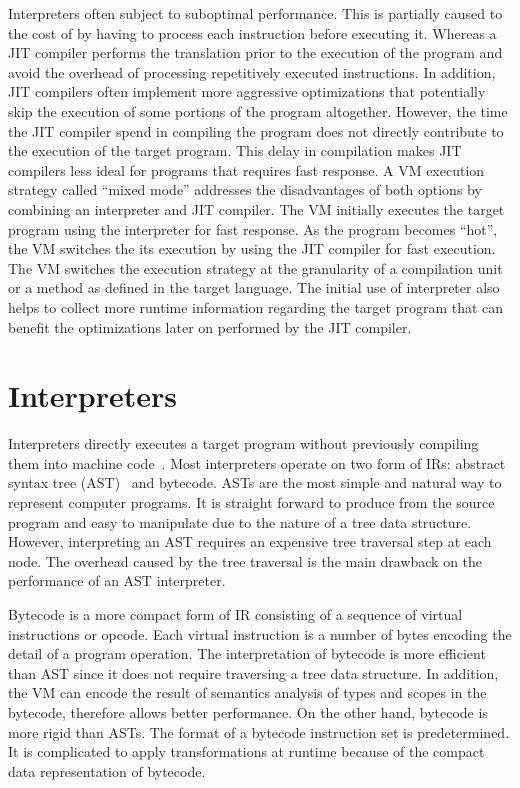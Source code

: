 Interpreters often subject to suboptimal performance.
This is partially caused to the cost of by having to process each instruction before executing it.
Whereas a JIT compiler performs the translation prior to the execution of the program and avoid the overhead of processing repetitively executed instructions.
In addition, JIT compilers often implement more aggressive optimizations that potentially skip the execution of some portions of the program altogether.
However, the time the JIT compiler spend in compiling the program does not directly contribute to the execution of the target program.
This delay in compilation makes JIT compilers less ideal for programs that requires fast response.
A VM execution strategy called ``mixed mode'' addresses the disadvantages of both options by combining an interpreter and JIT compiler.
The VM initially executes the target program using the interpreter for fast response.
As the program becomes ``hot'', the VM switches the its execution by using the JIT compiler for fast execution.
The VM switches the execution strategy at the granularity of a compilation unit or a method as defined in the target language.
The initial use of interpreter also helps to collect more runtime information regarding the target program that can benefit the optimizations later on performed by the JIT compiler.

\section{Interpreters}

Interpreters directly executes a target program without previously compiling them into machine code~\cite{debaere.campenhout+90, kogge+82}.
Most interpreters operate on two form of IRs: abstract syntax tree (AST)~\cite{jones2003abstract} and bytecode.
ASTs are the most simple and natural way to represent computer programs.
It is straight forward to produce from the source program and easy to manipulate due to the nature of a tree data structure.
However, interpreting an AST requires an expensive tree traversal step at each node.
The overhead caused by the tree traversal is the main drawback on the performance of an AST interpreter.

Bytecode is a more compact form of IR consisting of a sequence of virtual instructions or opcode.
Each virtual instruction is a number of bytes encoding the detail of a program operation.
The interpretation of bytecode is more efficient than AST since it does not require traversing a tree data structure.
In addition, the VM can encode the result of semantics analysis of types and scopes in the bytecode, therefore allows better performance.
On the other hand, bytecode is more rigid than ASTs.
The format of a bytecode instruction set is predetermined.
It is complicated to apply transformations at runtime because of the compact data representation of bytecode.

